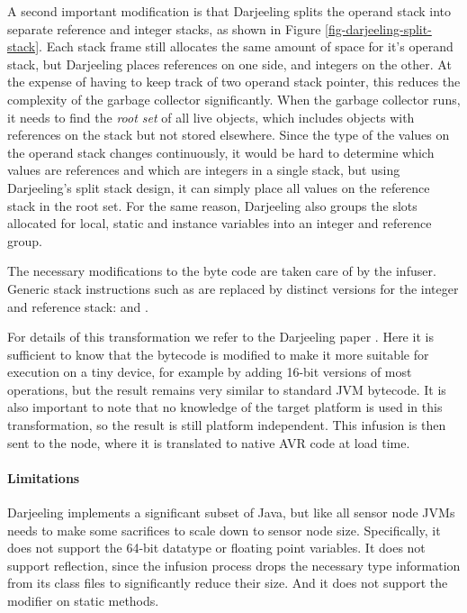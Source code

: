 A second important modification is that Darjeeling splits the operand stack into separate reference and integer stacks, as shown in Figure \ref{fig-darjeeling-split-stack}. Each stack frame still allocates the same amount of space for it's operand stack, but Darjeeling places references on one side, and integers on the other. At the expense of having to keep track of two operand stack pointer, this reduces the complexity of the garbage collector significantly. When the garbage collector runs, it needs to find the \emph{root set} of all live objects, which includes objects with references on the stack but not stored elsewhere. Since the type of the values on the operand stack changes continuously, it would be hard to determine which values are references and which are integers in a single stack, but using Darjeeling's split stack design, it can simply place all values on the reference stack in the root set. For the same reason, Darjeeling also groups the slots allocated for local, static and instance variables into an integer and reference group.

The necessary modifications to the byte code are taken care of by the infuser. Generic stack instructions such as  are replaced by distinct versions for the integer and reference stack:  and .

For details of this transformation we refer to the Darjeeling paper \cite{Brouwers:2009cj}. Here it is sufficient to know that the bytecode is modified to make it more suitable for execution on a tiny device, for example by adding 16-bit versions of most operations, but the result remains very similar to standard JVM bytecode. It is also important to note that no knowledge of the target platform is used in this transformation, so the result is still platform independent. This infusion is then sent to the node, where it is translated to native AVR code at load time.

\paragraph{Limitations}
Darjeeling implements a significant subset of Java, but like all sensor node JVMs needs to make some sacrifices to scale down to sensor node size. Specifically, it does not support the 64-bit  datatype or floating point variables. It does not support reflection, since the infusion process drops the necessary type information from its class files to significantly reduce their size. And it does not support the  modifier on static methods.

